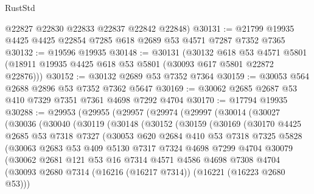 \begin{lexlean}{RustStd}
\begin{coremodule}
      @22827
      @22830
      @22833
      @22837
      @22842
      @22848)
@30131 := @21799 @19935 @4425 @4425 @22854 @7285 @618 @2689 @53 @4571 @7287 @7352 @7365
@30132 := @19596 @19935
@30148 := @30131
    (@30132
      @618
      @53
      @4571
      @5801
      (@18911 @19935 @4425 @618 @53 @5801 (@30093 @617 @5801 @22872 @22876)))
@30152 := @30132 @2689 @53 @7352 @7364
@30159 := @30053 @564 @2688 @2896 @53 @7352 @7362 @5647
@30169 := @30062 @2685 @2687 @53 @410 @7329 @7351 @7361 @4698 @7292 @4704
@30170 := @17794 @19935
@30288 := @29953
    (@29955
      (@29957
        (@29974
          (@29997
            (@30014
              (@30027
                (@30036
                  (@30040
                    (@30119
                      (@30148
                        (@30152
                          (@30159
                            (@30169
                              (@30170
                                @4425
                                @2685
                                @53
                                @7318
                                @7327
                                (@30053
                                  @620
                                  @2684
                                  @410
                                  @53
                                  @7318
                                  @7325
                                  @5828
                                  (@30063
                                    @2683
                                    @53
                                    @409
                                    @5130
                                    @7317
                                    @7324
                                    @4698
                                    @7299
                                    @4704
                                    @30079
                                    (@30062
                                      @2681
                                      @121
                                      @53
                                      @16
                                      @7314
                                      @4571
                                      @4586
                                      @4698
                                      @7308
                                      @4704
                                      (@30093
                                        @2680
                                        @7314
                                        (@16216 (@16217 @7314))
                                        (@16221 (@16223 @2680 @53)))

\end{coremodule}
\end{lexlean}
